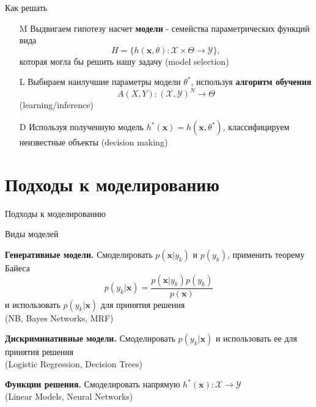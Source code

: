 \documentclass[10pt]{beamer}
\begin{document}
\begin{frame}{Как решать}

\begin{enumerate}

\item[M] Выдвигаем гипотезу насчет {\bf модели} - семейства параметрических функций вида
\[
H = \{h(\mathbf{x}, \theta): \mathcal{X} \times \Theta \rightarrow \mathcal{Y} \},
\]
которая могла бы решить нашу задачу (model selection)

\item[L] Выбираем наилучшие параметры модели $\theta^*$, используя {\bf алгоритм обучения}
\[
A(X, Y) : (\mathcal{X}, \mathcal{Y})^N \rightarrow \Theta
\]
(learning/inference)

\item[D] Используя полученную модель $h^*(\mathbf{x}) = h(\mathbf{x}, \theta^*)$, классифицируем неизвестные объекты (decision making)

\end{enumerate}

\end{frame}

\section{Подходы к моделированию}

\begin{frame}{}

\begin{center}
\Large Подходы к моделированию
\end{center}

\end{frame}

\begin{frame}{Виды моделей}

{\bf Генеративные модели.} Смоделировать $p(\mathbf{x} | y_k)$ и $p(y_k)$, применить теорему Байеса
\[
p(y_k | \mathbf{x}) = \frac{p(\mathbf{x} | y_k) p(y_k)}{p(\mathbf{x})}
\]
и использовать $p(y_k | \mathbf{x})$ для принятия решения \\ (NB, Bayes Networks, MRF)
\vspace{1em}

{\bf Дискриминативные модели.} Смоделировать $p(y_k | \mathbf{x})$ и использовать ее для принятия решения \\ (Logistic Regression, Decision Trees)
\vspace{1em}

{\bf Функции решения.} Смоделировать напрямую $h^*(\mathbf{x}): \mathcal{X} \rightarrow \mathcal{Y}$ \\ (Linear Models, Neural Networks)

\end{frame}
\end{document}
